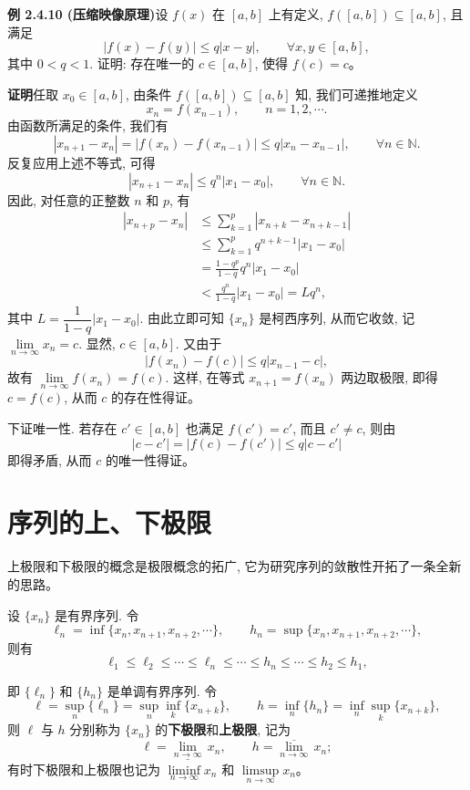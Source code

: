 \documentclass[UTF8,12pt,a4paper,fontset=fandol]{ctexart}
\begin{document}
\noindent\textbf{例 2.4.10 (压缩映像原理)}\quad 设 $f(x)$ 在 $[a,b]$ 上有定义, $f([a,b])\subseteq[a,b]$, 且满足
\[
  |f(x)-f(y)|\leqslant q|x-y|,\qquad \forall x,y\in[a,b],
\]
其中 $0<q<1$. 证明: 存在唯一的 $c\in[a,b]$, 使得 $f(c)=c$。

\noindent\textbf{证明}\quad 任取 $x_0\in[a,b]$, 由条件 $f([a,b])\subseteq[a,b]$ 知, 我们可递推地定义
\[
  x_n=f(x_{n-1}),\qquad n=1,2,\cdots.
\]
由函数所满足的条件, 我们有
\[
  |x_{n+1}-x_n|
  =
  |f(x_n)-f(x_{n-1})|
  \leqslant q|x_n-x_{n-1}|,\qquad \forall n\in\mathbb{N}.
\]
反复应用上述不等式, 可得
\[
  |x_{n+1}-x_n|\leqslant q^n|x_1-x_0|,\qquad \forall n\in\mathbb{N}.
\]
因此, 对任意的正整数 $n$ 和 $p$, 有
\[
\begin{aligned}
  |x_{n+p}-x_n|
  &\leqslant \sum_{k=1}^p |x_{n+k}-x_{n+k-1}|\\
  &\leqslant \sum_{k=1}^p q^{n+k-1}|x_1-x_0|\\
  &=
  \frac{1-q^p}{1-q}q^n|x_1-x_0|\\
  &<
  \frac{q^n}{1-q}|x_1-x_0|=Lq^n,
\end{aligned}
\]
其中 $L=\dfrac1{1-q}|x_1-x_0|$. 由此立即可知 $\{x_n\}$ 是柯西序列, 从而它收敛, 记 $\lim\limits_{n\to\infty}x_n=c$. 显然, $c\in[a,b]$. 又由于
\[
  |f(x_n)-f(c)|\leqslant q|x_{n-1}-c|,
\]
故有 $\lim\limits_{n\to\infty}f(x_n)=f(c)$. 这样, 在等式 $x_{n+1}=f(x_n)$ 两边取极限, 即得 $c=f(c)$, 从而 $c$ 的存在性得证。

下证唯一性. 若存在 $c'\in[a,b]$ 也满足 $f(c')=c'$, 而且 $c'\ne c$, 则由
\[
  |c-c'|=|f(c)-f(c')|\leqslant q|c-c'|
\]
即得矛盾, 从而 $c$ 的唯一性得证。

\section{序列的上、下极限}

上极限和下极限的概念是极限概念的拓广, 它为研究序列的敛散性开拓了一条全新的思路。

设 $\{x_n\}$ 是有界序列. 令
\[
  \ell_n=\inf\{x_n,x_{n+1},x_{n+2},\cdots\},
  \qquad
  h_n=\sup\{x_n,x_{n+1},x_{n+2},\cdots\},
\]
则有
\[
  \ell_1\leqslant\ell_2\leqslant\cdots\leqslant\ell_n\leqslant\cdots\leqslant h_n\leqslant\cdots\leqslant h_2\leqslant h_1,
\]

即 $\{\ell_n\}$ 和 $\{h_n\}$ 是单调有界序列. 令
\[
  \ell=\sup_n\{\ell_n\}=\sup_n\inf_k\{x_{n+k}\},
  \qquad
  h=\inf_n\{h_n\}=\inf_n\sup_k\{x_{n+k}\},
\]
则 $\ell$ 与 $h$ 分别称为 $\{x_n\}$ 的\textbf{下极限}和\textbf{上极限}, 记为
\[
  \ell=\underline{\lim_{n\to\infty}}\,x_n,\qquad
  h=\overline{\lim_{n\to\infty}}\,x_n;
\]
有时下极限和上极限也记为 $\liminf\limits_{n\to\infty}x_n$ 和 $\limsup\limits_{n\to\infty}x_n$。
\end{document}
